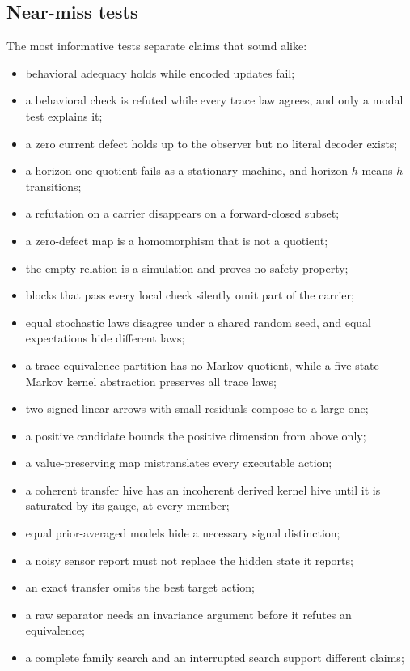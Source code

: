 \documentclass[11pt]{article}
\theoremstyle{definition}
\theoremstyle{plain}
\begin{document}
\subsection{Near-miss tests}

The most informative tests separate claims that sound alike:
\begin{itemize}
\item behavioral adequacy holds while encoded updates fail;
\item a behavioral check is refuted while every trace law agrees, and only a modal test explains it;
\item a zero current defect holds up to the observer but no literal decoder exists;
\item a horizon-one quotient fails as a stationary machine, and horizon $h$ means $h$ transitions;
\item a refutation on a carrier disappears on a forward-closed subset;
\item a zero-defect map is a homomorphism that is not a quotient;
\item the empty relation is a simulation and proves no safety property;
\item blocks that pass every local check silently omit part of the carrier;
\item equal stochastic laws disagree under a shared random seed, and equal expectations hide
different laws;
\item a trace-equivalence partition has no Markov quotient, while a five-state Markov kernel
abstraction preserves all trace laws;
\item two signed linear arrows with small residuals compose to a large one;
\item a positive candidate bounds the positive dimension from above only;
\item a value-preserving map mistranslates every executable action;
\item a coherent transfer hive has an incoherent derived kernel hive until it is saturated by its
gauge, at every member;
\item equal prior-averaged models hide a necessary signal distinction;
\item a noisy sensor report must not replace the hidden state it reports;
\item an exact transfer omits the best target action;
\item a raw separator needs an invariance argument before it refutes an equivalence;
\item a complete family search and an interrupted search support different claims;

\end{itemize}
\end{document}
